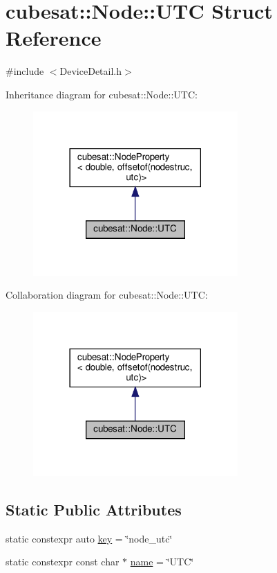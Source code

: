\hypertarget{structcubesat_1_1Node_1_1UTC}{}\section{cubesat\+:\+:Node\+:\+:U\+TC Struct Reference}
\label{structcubesat_1_1Node_1_1UTC}


{\ttfamily \#include $<$Device\+Detail.\+h$>$}



Inheritance diagram for cubesat\+:\+:Node\+:\+:U\+TC\+:
\nopagebreak
\begin{figure}[H]
\begin{center}
\leavevmode
\includegraphics[width=222pt]{structcubesat_1_1Node_1_1UTC__inherit__graph}
\end{center}
\end{figure}


Collaboration diagram for cubesat\+:\+:Node\+:\+:U\+TC\+:
\nopagebreak
\begin{figure}[H]
\begin{center}
\leavevmode
\includegraphics[width=222pt]{structcubesat_1_1Node_1_1UTC__coll__graph}
\end{center}
\end{figure}
\subsection*{Static Public Attributes}
\begin{DoxyCompactItemize}
\item 
static constexpr auto \hyperlink{structcubesat_1_1Node_1_1UTC_abc6c259871e7208ca0431fc3d23cefea}{key} = \char`\"{}node\+\_\+utc\char`\"{}
\item 
static constexpr const char $\ast$ \hyperlink{structcubesat_1_1Node_1_1UTC_aac5ffbb9b9d01262dc72cfd1cb06572c}{name} = \char`\"{}U\+TC\char`\"{}
\end{DoxyCompactItemize}
